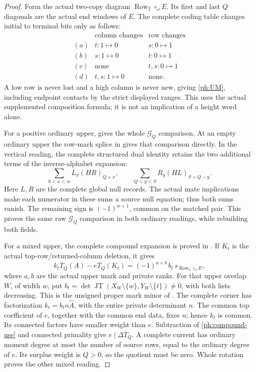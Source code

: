 \documentclass[11pt,a4paper]{amsart}
\numberwithin{equation}{section}
\theoremstyle{plain}
\theoremstyle{definition}
\newcommand{\Row}{\operatorname{Row}}
\newcommand{\JT}{\operatorname{JT}}
\begin{document}
\begin{proof}
Form the actual two-copy diagram \(\Row_2\circ_\omega E\).
Its first and last \(Q\) diagonals are the actual end windows of \(E\).
The complete coding table changes initial to terminal bits only as follows:
\[
\begin{array}{c|cc}
 &\text{column changes}&\text{row changes}\\ \hline
(a)&t:1\longmapsto0&s:0\longmapsto1\\
(b)&s:1\longmapsto0&t:0\longmapsto1\\
(c)&\text{none}&t,s:0\longmapsto1\\
(d)&t,s:1\longmapsto0&\text{none}.
\end{array}
\]
A low row is never lost and a high column is never new, giving
\eqref{ph:UM}, including endpoint contacts by the strict displayed ranges.
This uses the actual supplemented composition formula; it is not an
implication of a height word alone.

For a positive ordinary upper,  gives the
whole \(\mathcal G_Q\) comparison.  At an empty ordinary upper the
row-mark splice in  gives that comparison
directly.  In the vertical reading, the complete structured dual identity
 retains the two
additional terms of the inverse-alphabet expansion:
\[
 \sum_{0<x<w}L_x(HR)_{Q+x},\qquad
 \sum_{Q<y<S}R_y(HL)_{S+Q-y}.
\]
Here \(L,R\) are the complete global null records.  The actual mate
implications make each numerator in these sums a source null equation;
thus both sums vanish.  The remaining sign is \((-1)^{w+1}\), common
on the matched pair.  This proves the same raw \(\mathcal G_Q\)
comparison in both ordinary readings, while rebuilding both fields.

For a mixed upper, the complete compound expansion is proved in
.  If \(K_t\) is the actual top-row/returned-column
deletion, it gives
\begin{equation}\label{ph:compound-use}
 k_tT_Q(A)-eT_Q(K_t)=(-1)^{a+b}\,b_t\,s_{\Row_2\circ_\omega E},
\end{equation}
where \(a,b\) are the actual upper mark and private ranks.
For that upper overlap \(W\), of width \(w\), put
\(b_t=\det\JT(X_W\setminus\{w\},Y_W\setminus\{t\})\ne0\),
with both lists decreasing.  This is the unsigned proper mark minor
of .  The complete corner has factorization
\(k_t=b_t n\widehat A\), with the entire private determinant \(n\).
The common top coefficient of \(e\), together with the common end data,
fixes \(n\); hence \(k_t\) is common.  Its connected factors have smaller
weight than \(e\).  Subtraction of \eqref{ph:compound-use} and connected
primality give \(e\mid\Delta T_Q\).  A complete current has ordinary
moment degree at most the number of source rows, equal to the ordinary
degree of \(e\).  Its surplus weight is \(Q>0\), so the quotient must
be zero.  Whole rotation proves the other mixed reading.


\end{proof}
\end{document}
